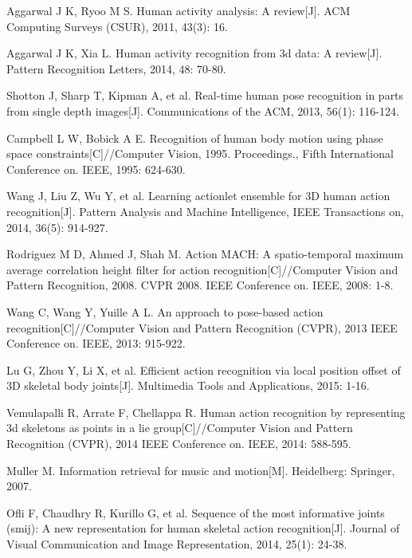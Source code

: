 \documentclass[conference]{IEEEtran}
\begin{document}
\begin{thebibliography}{1} 
Aggarwal J K, Ryoo M S. Human activity analysis: A review[J]. ACM Computing Surveys (CSUR), 2011, 43(3): 16.

Aggarwal J K, Xia L. Human activity recognition from 3d data: A review[J]. Pattern Recognition Letters, 2014, 48: 70-80.

Shotton J, Sharp T, Kipman A, et al. Real-time human pose recognition in parts from single depth images[J]. Communications of the ACM, 2013, 56(1): 116-124.

Campbell L W, Bobick A E. Recognition of human body motion using phase space constraints[C]//Computer Vision, 1995. Proceedings., Fifth International Conference on. IEEE, 1995: 624-630.

Wang J, Liu Z, Wu Y, et al. Learning actionlet ensemble for 3D human action recognition[J]. Pattern Analysis and Machine Intelligence, IEEE Transactions on, 2014, 36(5): 914-927.

Rodriguez M D, Ahmed J, Shah M. Action MACH: A spatio-temporal maximum average correlation height filter for action recognition[C]//Computer Vision and Pattern Recognition, 2008. CVPR 2008. IEEE Conference on. IEEE, 2008: 1-8.

Wang C, Wang Y, Yuille A L. An approach to pose-based action recognition[C]//Computer Vision and Pattern Recognition (CVPR), 2013 IEEE Conference on. IEEE, 2013: 915-922.

Lu G, Zhou Y, Li X, et al. Efficient action recognition via local position offset of 3D skeletal body joints[J]. Multimedia Tools and Applications, 2015: 1-16.

Vemulapalli R, Arrate F, Chellappa R. Human action recognition by representing 3d skeletons as points in a lie group[C]//Computer Vision and Pattern Recognition (CVPR), 2014 IEEE Conference on. IEEE, 2014: 588-595.

Muller M. Information retrieval for music and motion[M]. Heidelberg: Springer, 2007.

Ofli F, Chaudhry R, Kurillo G, et al. Sequence of the most informative joints (smij): A new representation for human skeletal action recognition[J]. Journal of Visual Communication and Image Representation, 2014, 25(1): 24-38.


\end{thebibliography}
\end{document}

